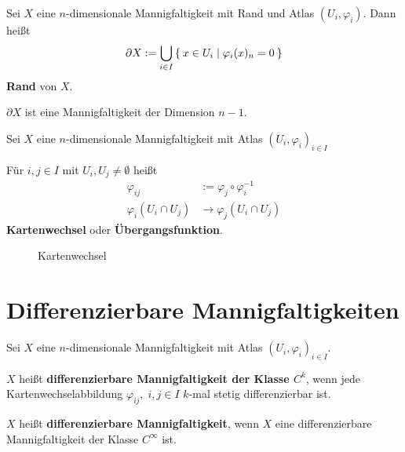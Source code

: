 \begin{definition}%
    Sei $X$ eine $n$-dimensionale Mannigfaltigkeit mit Rand und
    Atlas $(U_i, \varphi_i)$. Dann heißt 
    \[\partial X := \bigcup_{i\in I} \Set{x \in U_i | \varphi_i (x)_n = 0}\]
    \textbf{Rand} von $X$.
\end{definition}

$\partial X$ ist eine Mannigfaltigkeit der Dimension $n-1$.

\begin{definition}%
    Sei $X$ eine $n$-dimensionale Mannigfaltigkeit mit Atlas
    $(U_i, \varphi_i)_{i \in I}$

    Für $i, j \in I$ mit $U_i, U_j \neq \emptyset$ heißt
              \begin{align*}
                \varphi_{ij} &:= \varphi_j \circ \varphi_i^{-1}\\
                \varphi_i (U_i \cap U_j) &\rightarrow \varphi_j (U_i \cap U_j)
              \end{align*}
              \textbf{Kartenwechsel} oder \textbf{Übergangsfunktion}.
\end{definition}

\begin{figure}[htp]
    \centering
    
    \caption{Kartenwechsel}
    \label{fig:kartenwechsel}
\end{figure}

\section{Differenzierbare Mannigfaltigkeiten}\label{sec:8}
\begin{definition}%
    Sei $X$ eine $n$-dimensionale Mannigfaltigkeit mit Atlas $(U_i, \varphi_i)_{i \in I}$.

    \begin{defenum}
        \item $X$ heißt \textbf{differenzierbare Mannigfaltigkeit der Klasse $C^k$},
              wenn jede Kartenwechselabbildung $\varphi_{ij},\;i,j \in I$
              $k$-mal stetig differenzierbar ist.
        \item $X$ heißt \textbf{differenzierbare Mannigfaltigkeit},
              wenn $X$ eine differenzierbare Mannigfaltigkeit der
              Klasse $C^\infty$ ist.
    \end{defenum}
\end{definition}


